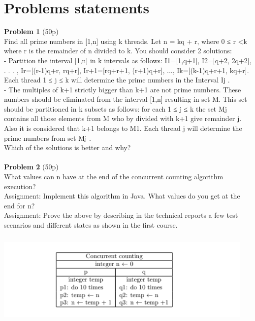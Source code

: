 \documentclass[14pt]{article}
\begin{document}
\section*{Problems statements}
\vspace{20 mm}
\textbf{Problem 1} (50p) \\
Find all prime numbers in [1,n] using k threads. Let n =
kq + r, where 0 ≤ r <k where r is the remainder of n divided to k. You should
consider 2 solutions:\\
- Partition the interval [1,n] in k intervals as follows: I1=[1,q+1], I2=[q+2,
2q+2], . . . , Ir=[(r-1)q+r, rq+r], Ir+1=[rq+r+1, (r+1)q+r], ..., Ik=[(k-1)q+r+1,
kq+r]. Each thread 1 ≤ j ≤ k will determine the prime numbers in the Interval
Ij .\\
- The multiples of k+1 strictly bigger than k+1 are not prime numbers. These
numbers should be eliminated from the interval [1,n] resulting in set M. This
set should be partitioned in k subsets as follows: for each 1 ≤ j ≤ k the set Mj
contains all those elements from M who by divided with k+1 give remainder j.
Also it is considered that k+1 belongs to M1. Each thread j will determine the
prime numbers from set Mj .\\
Which of the solutions is better and why?
\\\vspace{10 mm}\\
\textbf{Problem 2} (50p) \\
What values can n have at the end of the concurrent counting algorithm execution?
\\
Assignment: Implement this algorithm in Java. What values do you get at the
end for n? \\
Assignment: Prove the above by describing in the technical reports a few test
scenarios and different states as shown in the first course.\\
\begin{center}
\includegraphics[height=1.8in, width = 5in]{problem2.png}\\
\end{center}
\end{document}
